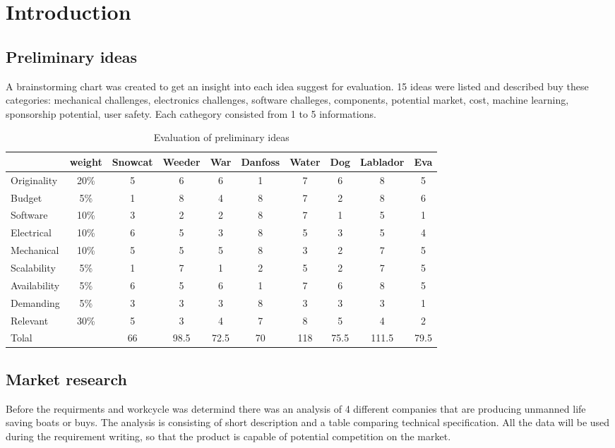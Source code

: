 \chapter{Introduction}

\section{Preliminary ideas}
A brainstorming chart was created to get an insight into each idea suggest for evaluation.
15 ideas were listed and described buy these categories: mechanical challenges, electronics challenges, 
software challeges, components, potential market, cost, machine learning, sponsorship potential, user safety.
Each cathegory consisted from 1 to 5 informations. 


\begin{table}[h!]
    \centering
\begin{tabular}{|p{3cm }|c|c|c|c|c|c|c|c|c| }
    
\hline
 &weight& Snowcat & Weeder & War & Danfoss & Water & Dog & Lablador & Eva  \\
\hline
Originality & 20\% & 5 & 6 & 6 & 1 & 7 & 6 & 8 & 5  \\
Budget & 5\% & 1 & 8  & 4 & 8 & 7 & 2 & 8 & 6 \\
Software & 10\% & 3 & 2  & 2 & 8 & 7 & 1 & 5 & 1 \\
Electrical & 10\% & 6 & 5 & 3 & 8 & 5 & 3 & 5 & 4\\
Mechanical & 10\%& 5 & 5 & 5 & 8 & 3 & 2 & 7 & 5 \\
Scalability & 5\%& 1 & 7 & 1 & 2 & 5 & 2 & 7 & 5\\
Availability & 5\%& 6 & 5 & 6 & 1 & 7 & 6 & 8 & 5 \\
Demanding & 5\% & 3 & 3 & 3 & 8 & 3 & 3 & 3 & 1 \\
Relevant & 30\% & 5 & 3 & 4& 7& 8 & 5 & 4&2\\
\hline
Tolal & &66 & 98.5 & 72.5 & 70 & 118 & 75.5 & 111.5 & 79.5 \\


\hline
\end{tabular}
 \caption{Evaluation of preliminary ideas }
    \label{tab:Preliminary_ideas}

\end{table}
\newpage

\section{Market research}
Before the requirments and workcycle was determind  there was an analysis of  4 different companies that are producing unmanned life saving boats or buys. The analysis is consisting of short description and a table comparing technical specification. All the data will be used during the requirement writing, so that the product is capable of potential competition on the market.
